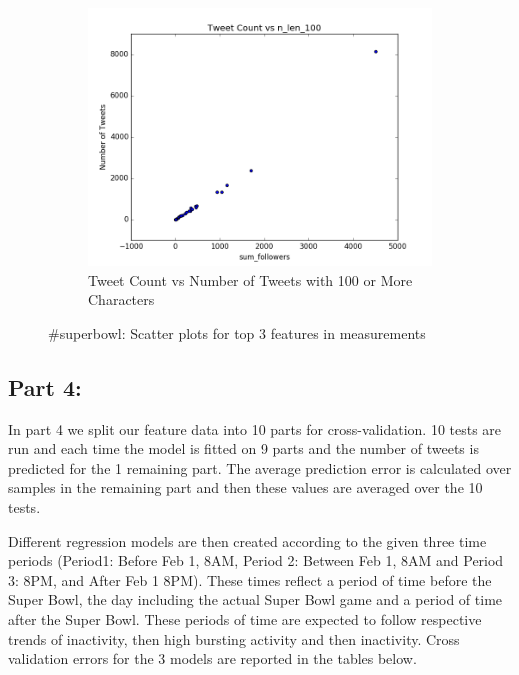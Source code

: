 \documentclass[12pt]{article}
\begin{document}
\begin{figure}[H]
\begin{subfigure}{.45\textwidth}
\includegraphics[width=\textwidth]{figures/count_vs_n_len_100_tweets_superbowl.png}
\caption{Tweet Count vs Number of Tweets with 100 or More Characters }
\label{part1:fig:LC}
\end{subfigure}

\caption{\#superbowl: Scatter plots for top 3 features in measurements}
\label{part1:fig}
\end{figure}

\subsection{Part 4:}

In part 4 we split our feature data into 10 parts for cross-validation. 10 tests are run and each time the model is fitted on 9 parts and the number of tweets is predicted for the 1 remaining part. The average prediction error is calculated over samples in the remaining part and then these values are averaged over the 10 tests.

Different regression models are then created according to the given three time periods (Period1: Before Feb 1, 8AM, Period 2: Between Feb 1, 8AM and Period 3: 8PM, and After Feb 1 8PM). These times reflect a period of time before the Super Bowl, the day including the actual Super Bowl game and a period of time after the Super Bowl. These periods of time are expected to follow respective trends of inactivity, then high bursting activity and then inactivity. Cross validation errors for the 3 models are reported in the tables below.
\end{document}
